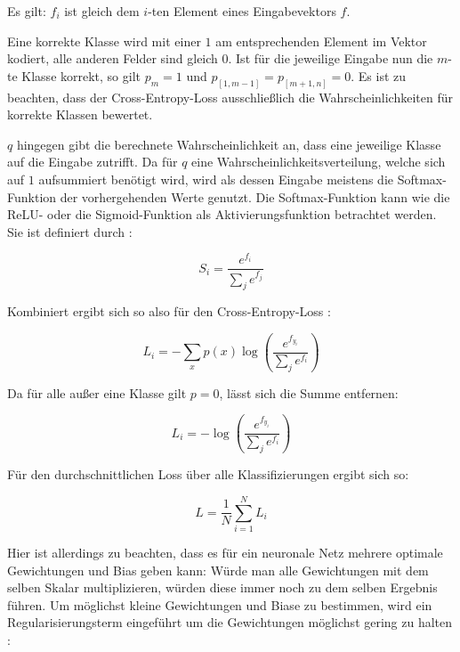 Es gilt: $f_i$ ist gleich dem $i$-ten Element eines Eingabevektors $f$.

Eine korrekte Klasse wird mit einer $1$ am entsprechenden Element im Vektor kodiert, alle anderen Felder sind gleich $0$. Ist für die jeweilige Eingabe nun \bspw die $m$-te Klasse korrekt, so gilt $p_m=1$ und $p_{\left[1,m-1\right]} = p_{\left[m+1,n\right]} = 0$. Es ist zu beachten, dass der Cross-Entropy-Loss ausschließlich die Wahrscheinlichkeiten für korrekte Klassen bewertet.

$q$ hingegen gibt die berechnete Wahrscheinlichkeit an, dass eine jeweilige Klasse auf die Eingabe zutrifft. Da für $q$ eine Wahrscheinlichkeitsverteilung, welche sich auf $1$ aufsummiert benötigt wird, wird als dessen Eingabe meistens die Softmax-Funktion der vorhergehenden Werte genutzt. Die Softmax-Funktion kann wie die ReLU- oder die Sigmoid-Funktion als Aktivierungsfunktion betrachtet werden. Sie ist definiert durch \cite{cs231n}:

\begin{equation}
S_i=\frac{e^{f_i}}{\sum_j e^{f_j}}
\end{equation}

Kombiniert ergibt sich so also für den Cross-Entropy-Loss \cite{cs231n}:

\begin{equation}
L_i = -\sum_x p(x)\log\left(\frac{e^{f_{y_i}}}{\sum_j e^{f_i}}\right)
\end{equation}

Da für alle außer eine Klasse gilt $p=0$, lässt sich die Summe entfernen:

\begin{equation}
L_i = -\log\left(\frac{e^{f_{y_i}}}{\sum_j e^{f_i}}\right)
\end{equation}


Für den durchschnittlichen Loss über alle Klassifizierungen ergibt sich so:

\begin{equation}
L = \frac{1}{N}\sum_{i=1}^{N}L_i
\end{equation}

Hier ist allerdings zu beachten, dass es für ein neuronale Netz mehrere optimale Gewichtungen und Bias geben kann: Würde man \bspw alle Gewichtungen mit dem selben Skalar multiplizieren, würden diese immer noch zu dem selben Ergebnis führen. Um möglichst kleine Gewichtungen und Biase zu bestimmen, wird ein Regularisierungsterm eingeführt um die Gewichtungen möglichst gering zu halten \cite{cs231n}:

